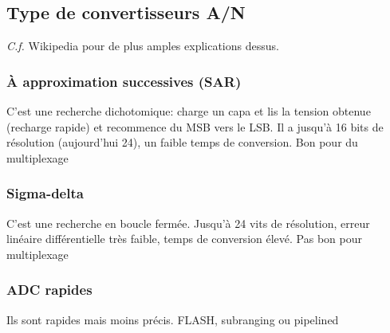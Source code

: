 \subsection{Type de convertisseurs A/N}
\textit{C.f.} Wikipedia pour de plus amples explications dessus.
\subsubsection{À approximation successives (SAR)}
C'est une recherche dichotomique: charge un capa et lis la tension obtenue (recharge rapide) et recommence du MSB vers le LSB. Il a jusqu'à 16 bits de résolution (aujourd'hui 24), un faible temps de conversion. Bon pour du multiplexage
\subsubsection{Sigma-delta}
C'est une recherche en boucle fermée. Jusqu'à 24 vits de résolution, erreur linéaire différentielle très faible, temps de conversion élevé. Pas bon pour multiplexage
\subsubsection{ADC rapides}
Ils sont rapides mais moins précis. FLASH, subranging ou pipelined\bigskip